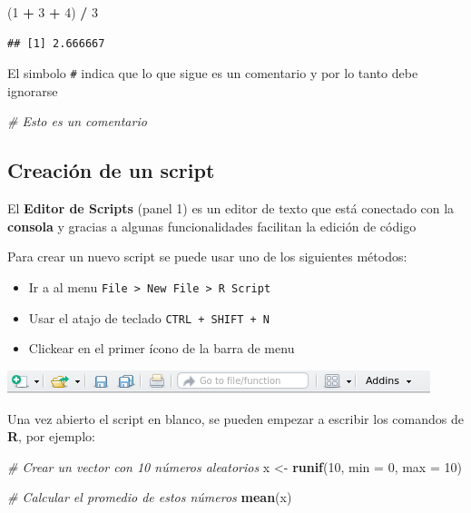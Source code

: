 \documentclass[a4paper]{book}
\newenvironment{Shaded}{\begin{snugshade}}{\end{snugshade}}
\newcommand{\CommentTok}[1]{\textcolor[rgb]{0.56,0.35,0.01}{\textit{#1}}}
\newcommand{\DataTypeTok}[1]{\textcolor[rgb]{0.13,0.29,0.53}{#1}}
\newcommand{\DecValTok}[1]{\textcolor[rgb]{0.00,0.00,0.81}{#1}}
\newcommand{\KeywordTok}[1]{\textcolor[rgb]{0.13,0.29,0.53}{\textbf{#1}}}
\newcommand{\NormalTok}[1]{#1}
\newcommand{\OperatorTok}[1]{\textcolor[rgb]{0.81,0.36,0.00}{\textbf{#1}}}
\newcommand{\StringTok}[1]{\textcolor[rgb]{0.31,0.60,0.02}{#1}}
\providecommand{\tightlist}{%
  \setlength{\itemsep}{0pt}\setlength{\parskip}{0pt}}
\begin{document}
\begin{Shaded}
\begin{Highlighting}[]
\NormalTok{(}\DecValTok{1} \OperatorTok{+}\StringTok{ }\DecValTok{3} \OperatorTok{+}\StringTok{ }\DecValTok{4}\NormalTok{) }\OperatorTok{/}\StringTok{ }\DecValTok{3}
\end{Highlighting}
\end{Shaded}

\begin{verbatim}
## [1] 2.666667
\end{verbatim}

El simbolo \texttt{\#} indica que lo que sigue es un comentario y por lo
tanto debe ignorarse

\begin{Shaded}
\begin{Highlighting}[]
\CommentTok{# Esto es un comentario}
\end{Highlighting}
\end{Shaded}

\hypertarget{creacion-de-un-script}{%
\subsection{Creación de un script}\label{creacion-de-un-script}}

El \textbf{Editor de Scripts} (panel 1) es un editor de texto que está
conectado con la \textbf{consola} y gracias a algunas funcionalidades
facilitan la edición de código

Para crear un nuevo script se puede usar uno de los siguientes métodos:

\begin{itemize}
\tightlist
\item
  Ir a al menu
  \texttt{File\ \textgreater{}\ New\ File\ \textgreater{}\ R\ Script}
\item
  Usar el atajo de teclado \texttt{CTRL\ +\ SHIFT\ +\ N}
\item
  Clickear en el primer ícono de la barra de menu
\end{itemize}

\includegraphics{images/menu_bar.png}

Una vez abierto el script en blanco, se pueden empezar a escribir los
comandos de \textbf{R}, por ejemplo:

\begin{Shaded}
\begin{Highlighting}[]
\CommentTok{# Crear un vector con 10 números aleatorios}
\NormalTok{x <-}\StringTok{ }\KeywordTok{runif}\NormalTok{(}\DecValTok{10}\NormalTok{, }\DataTypeTok{min =} \DecValTok{0}\NormalTok{, }\DataTypeTok{max =} \DecValTok{10}\NormalTok{)}

\CommentTok{# Calcular el promedio de estos números}
\KeywordTok{mean}\NormalTok{(x)}
\end{Highlighting}
\end{Shaded}
\end{document}
